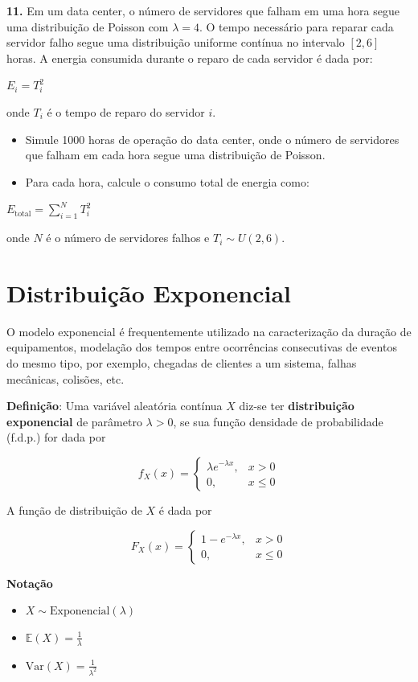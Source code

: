 \documentclass[
]{book}
\providecommand{\tightlist}{%
  \setlength{\itemsep}{0pt}\setlength{\parskip}{0pt}}
\begin{document}
\textbf{11.} Em um data center, o número de servidores que falham em uma hora segue uma distribuição de Poisson com \(\lambda = 4\). O tempo necessário para reparar cada servidor falho segue uma distribuição uniforme contínua no intervalo \([2, 6]\) horas. A energia consumida durante o reparo de cada servidor é dada por:

\(E_i = T_i^2\)

onde \(T_i\) é o tempo de reparo do servidor \(i\).

\begin{itemize}
\item
  Simule 1000 horas de operação do data center, onde o número de servidores que falham em cada hora segue uma distribuição de Poisson.
\item
  Para cada hora, calcule o consumo total de energia como:
\end{itemize}

\(E_{\text{total}} = \sum_{i=1}^N T_i^2\)

onde \(N\) é o número de servidores falhos e \(T_i \sim U(2, 6)\).

\section{Distribuição Exponencial}\label{distribuiuxe7uxe3o-exponencial}

O modelo exponencial é frequentemente utilizado na caracterização da duração de equipamentos, modelação dos tempos entre ocorrências consecutivas de eventos do mesmo tipo, por exemplo, chegadas de clientes a um sistema, falhas mecânicas, colisões, etc.

\textbf{Definição}: Uma variável aleatória contínua \(X\) diz-se ter \textbf{distribuição exponencial} de parâmetro \(\lambda > 0\), se sua função densidade de probabilidade (f.d.p.) for dada por

\[
f_X(x) = 
\begin{cases}
\lambda e^{-\lambda x}, & x > 0 \\
0, & x \leq 0
\end{cases}
\]

A função de distribuição de \(X\) é dada por

\[
F_X(x) = 
\begin{cases}
1 - e^{-\lambda x}, & x > 0 \\
0, & x \leq 0
\end{cases}
\]

\textbf{Notação}

\begin{itemize}
\tightlist
\item
  \(X \sim \text{Exponencial}(\lambda)\)
\item
  \(\mathbb{E}(X) = \frac{1}{\lambda}\)
\item
  \(\text{Var}(X) = \frac{1}{\lambda^2}\)
\end{itemize}
\end{document}
